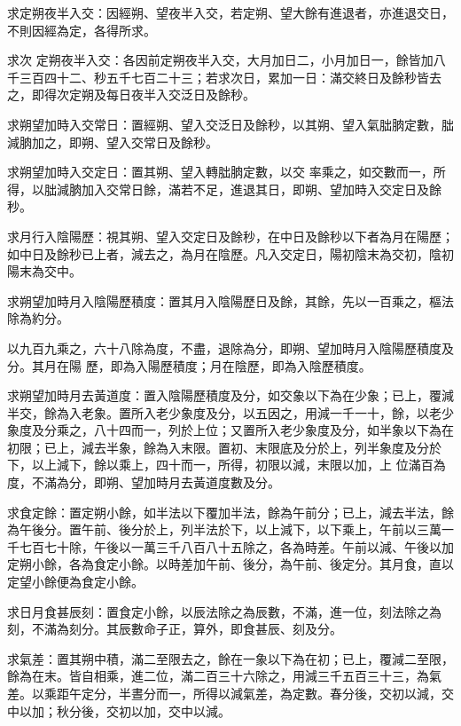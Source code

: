 \begin{pinyinscope}
 求定朔夜半入交：因經朔、望夜半入交，若定朔、望大餘有進退者，亦進退交日，不則因經為定，各得所求。



 求次
 定朔夜半入交：各因前定朔夜半入交，大月加日二，小月加日一，餘皆加八千三百四十二、秒五千七百二十三；若求次日，累加一日：滿交終日及餘秒皆去之，即得次定朔及每日夜半入交泛日及餘秒。



 求朔望加時入交常日：置經朔、望入交泛日及餘秒，以其朔、望入氣朏朒定數，朏減朒加之，即朔、望入交常日及餘秒。



 求朔望加時入交定日：置其朔、望入轉朏朒定數，以交
 率乘之，如交數而一，所得，以朏減朒加入交常日餘，滿若不足，進退其日，即朔、望加時入交定日及餘秒。



 求月行入陰陽歷：視其朔、望入交定日及餘秒，在中日及餘秒以下者為月在陽歷；如中日及餘秒已上者，減去之，為月在陰歷。凡入交定日，陽初陰末為交初，陰初陽末為交中。



 求朔望加時月入陰陽歷積度：置其月入陰陽歷日及餘，其餘，先以一百乘之，樞法除為約分。



 以九百九乘之，六十八除為度，不盡，退除為分，即朔、望加時月入陰陽歷積度及分。其月在陽
 歷，即為入陽歷積度；月在陰歷，即為入陰歷積度。



 求朔望加時月去黃道度：置入陰陽歷積度及分，如交象以下為在少象；已上，覆減半交，餘為入老象。置所入老少象度及分，以五因之，用減一千一十，餘，以老少象度及分乘之，八十四而一，列於上位；又置所入老少象度及分，如半象以下為在初限；已上，減去半象，餘為入末限。置初、末限底及分於上，列半象度及分於下，以上減下，餘以乘上，四十而一，所得，初限以減，末限以加，上
 位滿百為度，不滿為分，即朔、望加時月去黃道度數及分。



 求食定餘：置定朔小餘，如半法以下覆加半法，餘為午前分；已上，減去半法，餘為午後分。置午前、後分於上，列半法於下，以上減下，以下乘上，午前以三萬一千七百七十除，午後以一萬三千八百八十五除之，各為時差。午前以減、午後以加定朔小餘，各為食定小餘。以時差加午前、後分，為午前、後定分。其月食，直以定望小餘便為食定小餘。



 求日月食甚辰刻：置食定小餘，以辰法除之為辰數，不滿，進一位，刻法除之為刻，不滿為刻分。其辰數命子正，算外，即食甚辰、刻及分。



 求氣差：置其朔中積，滿二至限去之，餘在一象以下為在初；已上，覆減二至限，餘為在末。皆自相乘，進二位，滿二百三十六除之，用減三千五百三十三，為氣差。以乘距午定分，半晝分而一，所得以減氣差，為定數。春分後，交初以減，交中以加；秋分後，交初以加，交中以減。




\end{pinyinscope}
